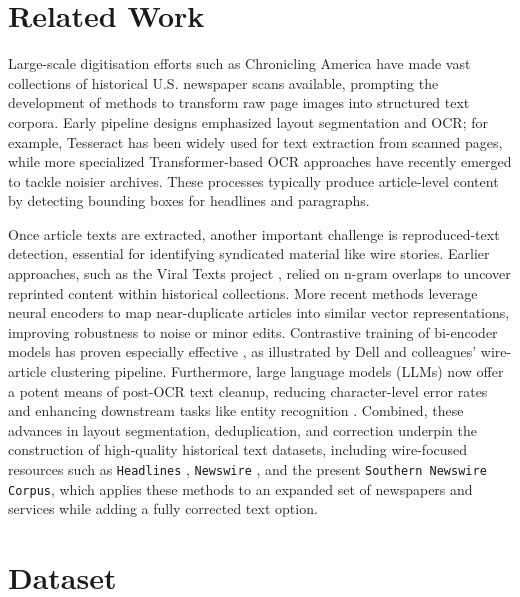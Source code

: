 \documentclass{article}
\begin{document}
\section{Related Work}
\label{sec:related}

Large-scale digitisation efforts such as Chronicling America \cite{chroniclingamer} have made vast collections of historical U.S. newspaper scans available, prompting the development of methods to transform raw page images into structured text corpora. Early pipeline designs emphasized layout segmentation and OCR; for example, Tesseract has been widely used for text extraction from scanned pages, while more specialized Transformer-based OCR approaches \cite{dell2024americanstories} have recently emerged to tackle noisier archives. These processes typically produce article-level content by detecting bounding boxes for headlines and paragraphs.

Once article texts are extracted, another important challenge is reproduced-text detection, essential for identifying syndicated material like wire stories. Earlier approaches, such as the Viral Texts project \cite{smith2015}, relied on n-gram overlaps to uncover reprinted content within historical collections. More recent methods leverage neural encoders to map near-duplicate articles into similar vector representations, improving robustness to noise or minor edits. Contrastive training of bi-encoder models has proven especially effective \cite{sentencebert}, as illustrated by Dell and colleagues’ wire-article clustering pipeline. Furthermore, large language models (LLMs) now offer a potent means of post-OCR text cleanup, reducing character-level error rates and enhancing downstream tasks like entity recognition \cite{brown2020language}. Combined, these advances in layout segmentation, deduplication, and correction underpin the construction of high-quality historical text datasets, including wire-focused resources such as \texttt{Headlines} \cite{headlines2024}, \texttt{Newswire} \cite{dell2024newswire}, and the present \texttt{Southern Newswire Corpus}, which applies these methods to an expanded set of newspapers and services while adding a fully corrected text option.


\section{Dataset}
\label{sec:dataset}
\end{document}
